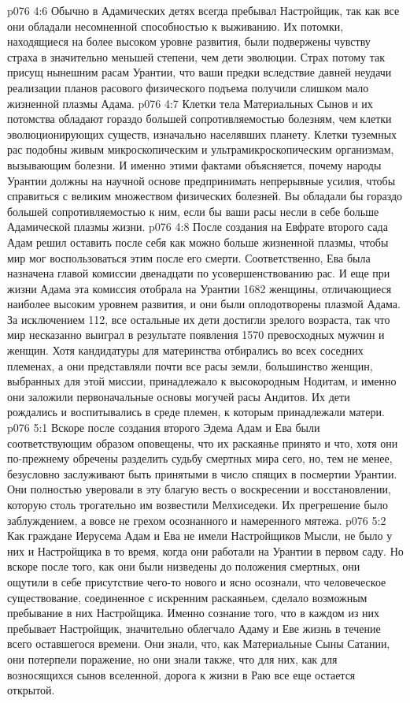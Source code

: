 \vs p076 4:6 Обычно в Адамических детях всегда пребывал Настройщик, так как все они обладали несомненной способностью к выживанию. Их потомки, находящиеся на более высоком уровне развития, были подвержены чувству страха в значительно меньшей степени, чем дети эволюции. Страх потому так присущ нынешним расам Урантии, что ваши предки вследствие давней неудачи реализации планов расового физического подъема получили слишком мало жизненной плазмы Адама.
\vs p076 4:7 Клетки тела Материальных Сынов и их потомства обладают гораздо большей сопротивляемостью болезням, чем клетки эволюционирующих существ, изначально населявших планету. Клетки туземных рас подобны живым микроскопическим и ультрамикроскопическим организмам, вызывающим болезни. И именно этими фактами объясняется, почему народы Урантии должны на научной основе предпринимать непрерывные усилия, чтобы справиться с великим множеством физических болезней. Вы обладали бы гораздо большей сопротивляемостью к ним, если бы ваши расы несли в себе больше Адамической плазмы жизни.
\vs p076 4:8 \pc После создания на Евфрате второго сада Адам решил оставить после себя как можно больше жизненной плазмы, чтобы мир мог воспользоваться этим после его смерти. Соответственно, Ева была назначена главой комиссии двенадцати по усовершенствованию рас. И еще при жизни Адама эта комиссия отобрала на Урантии 1682 женщины, отличающиеся наиболее высоким уровнем развития, и они были оплодотворены плазмой Адама. За исключением 112, все остальные их дети достигли зрелого возраста, так что мир несказанно выиграл в результате появления 1570 превосходных мужчин и женщин. Хотя кандидатуры для материнства отбирались во всех соседних племенах, а они представляли почти все расы земли, большинство женщин, выбранных для этой миссии, принадлежало к высокородным Нодитам, и именно они заложили первоначальные основы могучей расы Андитов. Их дети рождались и воспитывались в среде племен, к которым принадлежали матери.
\vs p076 5:1 Вскоре после создания второго Эдема Адам и Ева были соответствующим образом оповещены, что их раскаянье принято и что, хотя они по\hyp{}прежнему обречены разделить судьбу смертных мира сего, но, тем не менее, безусловно заслуживают быть принятыми в число спящих в посмертии Урантии. Они полностью уверовали в эту благую весть о воскресении и восстановлении, которую столь трогательно им возвестили Мелхиседеки. Их прегрешение было заблуждением, а вовсе не грехом осознанного и намеренного мятежа.
\vs p076 5:2 Как граждане Иерусема Адам и Ева не имели Настройщиков Мысли, не было у них и Настройщика в то время, когда они работали на Урантии в первом саду. Но вскоре после того, как они были низведены до положения смертных, они ощутили в себе присутствие чего\hyp{}то нового и ясно осознали, что человеческое существование, соединенное с искренним раскаяньем, сделало возможным пребывание в них Настройщика. Именно сознание того, что в каждом из них пребывает Настройщик, значительно облегчало Адаму и Еве жизнь в течение всего оставшегося времени. Они знали, что, как Материальные Сыны Сатании, они потерпели поражение, но они знали также, что для них, как для возносящихся сынов вселенной, дорога к жизни в Раю все еще остается открытой.
